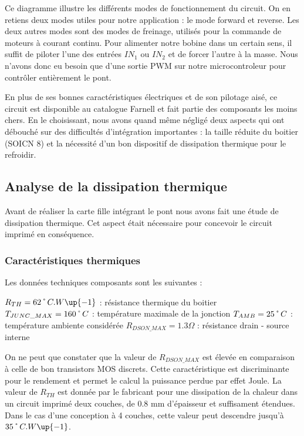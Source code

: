 \documentclass[11pt, french]{article} %
\begin{document}
Ce diagramme illustre les différents modes de fonctionnement du circuit. On en retiens deux modes utiles pour notre application : le mode forward et reverse. Les deux autres modes sont des modes de freinage, utilisés pour la commande de moteurs à courant continu. Pour alimenter notre bobine dans un certain sens, il suffit de piloter l'une des entrées $ IN_1 $ ou $ IN_2 $ et de forcer l'autre à la masse. Nous n'avons donc eu besoin que d'une sortie PWM sur notre microcontroleur pour contrôler entièrement le pont.

\medskip
En plus de ses bonnes caractéristiques électriques et de son pilotage aisé, ce circuit est disponible au catalogue Farnell et fait partie des composants les moins chers. En le choisissant, nous avons quand même négligé deux aspects qui ont débouché sur des difficultés d'intégration importantes : la taille réduite du boitier (SOICN 8) et la nécessité d'un bon dispositif de dissipation thermique pour le refroidir.

\subsection{Analyse de la dissipation thermique}
Avant de réaliser la carte fille intégrant le pont nous avons fait une étude de dissipation thermique. Cet aspect était nécessaire pour concevoir le circuit imprimé en conséquence.

\subsubsection{Caractéristiques thermiques}
Les données techniques composants sont les suivantes :

\medskip
\noindent
$ R_{TH} = 62 \char23C.W\up{-1} $ : résistance thermique du boitier \newline
$ T_{JUNC\_{MAX}} = 160 \char23C $ : température maximale de la jonction \newline
$ T_{AMB} = 25\char23C $ : température ambiente considérée \newline
$ R_{DSON\_{MAX}} = 1.3 \Omega $ : résistance drain - source interne \newline
\noindent

On ne peut que constater que la valeur de $ R_{DSON\_{MAX}} $ est élevée en comparaison à celle de bon transistors MOS discrets. Cette caractéristique est discriminante pour le rendement et permet le calcul la puissance perdue par effet Joule. La valeur de $R_{TH}$ est donnée par le fabricant pour une dissipation de la chaleur dans un circuit imprimé deux couches, de 0.8 mm d'épaisseur et suffisament étendues. Dans le cas d'une conception à 4 couches, cette valeur peut descendre jusqu'à $ 35 \char23C.W\up{-1} $.
\end{document}
